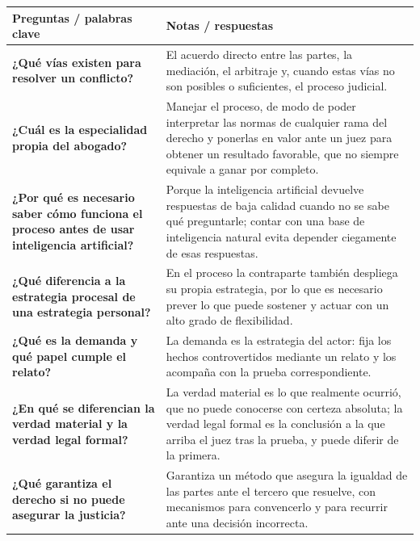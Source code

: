 \documentclass[12pt,oneside]{book}
\begin{document}
\begin{table}[H]
\centering
\begin{tabularx}{\textwidth}{
    >{\raggedright\arraybackslash}p{}
    >{\raggedright\arraybackslash}X
}
\toprule
\textbf{Preguntas / palabras clave} & \textbf{Notas / respuestas} \\
\midrule

\textbf{¿Qué vías existen para resolver un conflicto?} &
El acuerdo directo entre las partes, la mediación, el arbitraje y, cuando estas vías no son posibles o suficientes, el proceso judicial. \\

\textbf{¿Cuál es la especialidad propia del abogado?} &
Manejar el proceso, de modo de poder interpretar las normas de cualquier rama del derecho y ponerlas en valor ante un juez para obtener un resultado favorable, que no siempre equivale a ganar por completo. \\

\textbf{¿Por qué es necesario saber cómo funciona el proceso antes de usar inteligencia artificial?} &
Porque la inteligencia artificial devuelve respuestas de baja calidad cuando no se sabe qué preguntarle; contar con una base de inteligencia natural evita depender ciegamente de esas respuestas. \\

\textbf{¿Qué diferencia a la estrategia procesal de una estrategia personal?} &
En el proceso la contraparte también despliega su propia estrategia, por lo que es necesario prever lo que puede sostener y actuar con un alto grado de flexibilidad. \\

\textbf{¿Qué es la demanda y qué papel cumple el relato?} &
La demanda es la estrategia del actor: fija los hechos controvertidos mediante un relato y los acompaña con la prueba correspondiente. \\

\textbf{¿En qué se diferencian la verdad material y la verdad legal formal?} &
La verdad material es lo que realmente ocurrió, que no puede conocerse con certeza absoluta; la verdad legal formal es la conclusión a la que arriba el juez tras la prueba, y puede diferir de la primera. \\

\textbf{¿Qué garantiza el derecho si no puede asegurar la justicia?} &
Garantiza un método que asegura la igualdad de las partes ante el tercero que resuelve, con mecanismos para convencerlo y para recurrir ante una decisión incorrecta. \\


\end{tabularx}
\end{table}
\end{document}
